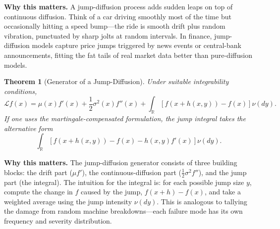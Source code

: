 \documentclass[11pt,a4paper,openany]{book}
\theoremstyle{definition}
\theoremstyle{plain}
\newtheorem{theorem}{Theorem}[chapter]
\theoremstyle{remark}
\newcommand{\1}{\mathbbm{1}}
\newcommand{\R}{\mathbb{R}}
\newcommand{\calL}{\mathcal{L}}
\begin{document}
\medskip
\noindent\textbf{Why this matters.} A jump-diffusion process adds sudden leaps on top of continuous diffusion. Think of a car driving smoothly most of the time but occasionally hitting a speed bump---the ride is smooth drift plus random vibration, punctuated by sharp jolts at random intervals. In finance, jump-diffusion models capture price jumps triggered by news events or central-bank announcements, fitting the fat tails of real market data better than pure-diffusion models.

\begin{theorem}[Generator of a Jump-Diffusion]
Under suitable integrability conditions,
\[
\boxed{\calL f(x) = \mu(x) f'(x) + \frac{1}{2} \sigma^{2}(x) f''(x) + \int_{\R} \left[f(x + h(x,y)) - f(x)\right] \nu(dy)}.
\]
If one uses the martingale-compensated formulation, the jump integral takes the alternative form
\[
\int_{\R} \left[f(x + h(x,y)) - f(x) - h(x,y) f'(x)\right] \nu(dy).
\]
\end{theorem}

\medskip
\noindent\textbf{Why this matters.} The jump-diffusion generator consists of three building blocks: the drift part ($\mu f'$), the continuous-diffusion part ($\frac{1}{2}\sigma^2 f''$), and the jump part (the integral). The intuition for the integral is: for each possible jump size $y$, compute the change in $f$ caused by the jump, $f(x+h) - f(x)$, and take a weighted average using the jump intensity $\nu(dy)$. This is analogous to tallying the damage from random machine breakdowns---each failure mode has its own frequency and severity distribution.
\end{document}
